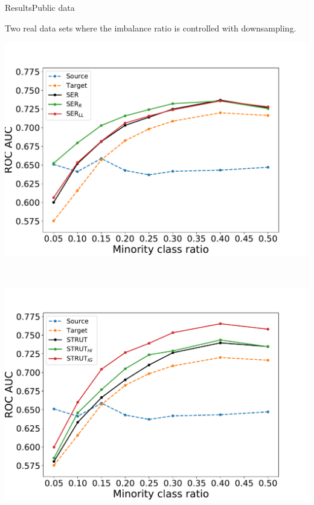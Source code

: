 \documentclass[8pt,t,aspectratio=1610]{beamer}
\newcommand{\ratio}{0.5}
\begin{document}
\begin{frame}[noframenumbering]{Results}{Public data}

\centering
Two real data sets where the imbalance ratio is controlled with downsampling.


\renewcommand{\ratio}{0.9}
        \centering
        \begin{minipage}[t]{0.33\linewidth}\vspace{0pt}
            \centering
            \begin{minipage}[t]{\ratio\linewidth}\vspace{0pt}
            \centerline{\includegraphics[width=\linewidth, trim={0 0 0 50}, clip]{SER_ll_05_Datamagic_gamma_telescope_Scorefilescores_2020_02_17_2_BALANCESOURCE50_KFOLD5_NTARGET_NB_TREE1_BarPlot_AUC_depthNone.pdf}}
            \end{minipage}\\
            \begin{minipage}[t]{\ratio\linewidth}\vspace{0cm}
            \centerline{\includegraphics[width=\linewidth, trim={0 0 0 40}, clip]{STRUT_Datamagic_gamma_telescope_Scorefilescores_2020_02_17_2_BALANCESOURCE50_KFOLD5_NTARGET_NB_TREE1_BarPlot_AUC_depthNone_ig.pdf}}

\end{minipage}
\end{minipage}
\end{frame}
\end{document}
